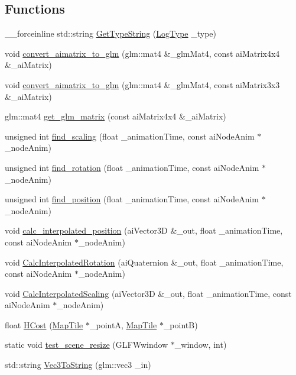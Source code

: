 \subsection*{Functions}
\begin{DoxyCompactItemize}
\item 
\+\_\+\+\_\+forceinline std\+::string \mbox{\hyperlink{namespacepiolot_a488b12f83c55ec14c4a0b967d089b0f2}{Get\+Type\+String}} (\mbox{\hyperlink{namespacepiolot_a23b501c43e72ecf3dbf1146b2919c3a3}{Log\+Type}} \+\_\+type)
\item 
void \mbox{\hyperlink{namespacepiolot_a2458e8951ed1473d866e7a5567a3342a}{convert\+\_\+aimatrix\+\_\+to\+\_\+glm}} (glm\+::mat4 \&\+\_\+glm\+Mat4, const ai\+Matrix4x4 \&\+\_\+ai\+Matrix)
\item 
void \mbox{\hyperlink{namespacepiolot_a3ccd1d151ed200e3777ef66fae46f2cf}{convert\+\_\+aimatrix\+\_\+to\+\_\+glm}} (glm\+::mat4 \&\+\_\+glm\+Mat4, const ai\+Matrix3x3 \&\+\_\+ai\+Matrix)
\item 
glm\+::mat4 \mbox{\hyperlink{namespacepiolot_a935ff41053563f29ec150b73a083a3b8}{get\+\_\+glm\+\_\+matrix}} (const ai\+Matrix4x4 \&\+\_\+ai\+Matrix)
\item 
unsigned int \mbox{\hyperlink{namespacepiolot_a568b9e7ad3c877dcd9b32fa4e6f6c9e1}{find\+\_\+scaling}} (float \+\_\+animation\+Time, const ai\+Node\+Anim $\ast$\+\_\+node\+Anim)
\item 
unsigned int \mbox{\hyperlink{namespacepiolot_a3573afdd46fe4ac83df06c50a0dfe0f3}{find\+\_\+rotation}} (float \+\_\+animation\+Time, const ai\+Node\+Anim $\ast$\+\_\+node\+Anim)
\item 
unsigned int \mbox{\hyperlink{namespacepiolot_aec1ad7fb84906e9bbeb5f140d8b9a0b6}{find\+\_\+position}} (float \+\_\+animation\+Time, const ai\+Node\+Anim $\ast$\+\_\+node\+Anim)
\item 
void \mbox{\hyperlink{namespacepiolot_a1e5ba3095d4e569745a7e0aa844faa11}{calc\+\_\+interpolated\+\_\+position}} (ai\+Vector3D \&\+\_\+out, float \+\_\+animation\+Time, const ai\+Node\+Anim $\ast$\+\_\+node\+Anim)
\item 
void \mbox{\hyperlink{namespacepiolot_a22a267ba7b419acc67701bad790e186f}{Calc\+Interpolated\+Rotation}} (ai\+Quaternion \&\+\_\+out, float \+\_\+animation\+Time, const ai\+Node\+Anim $\ast$\+\_\+node\+Anim)
\item 
void \mbox{\hyperlink{namespacepiolot_a66a046124f1f3d518e9f66ad63de5f51}{Calc\+Interpolated\+Scaling}} (ai\+Vector3D \&\+\_\+out, float \+\_\+animation\+Time, const ai\+Node\+Anim $\ast$\+\_\+node\+Anim)
\item 
float \mbox{\hyperlink{namespacepiolot_adf45d5b01aecdade8cbb9ba156173a78}{H\+Cost}} (\mbox{\hyperlink{classpiolot_1_1_map_tile}{Map\+Tile}} $\ast$\+\_\+pointA, \mbox{\hyperlink{classpiolot_1_1_map_tile}{Map\+Tile}} $\ast$\+\_\+pointB)
\item 
static void \mbox{\hyperlink{namespacepiolot_aa0ef29ea15ee9e00027a276fa8d430e6}{test\+\_\+scene\+\_\+resize}} (G\+L\+F\+Wwindow $\ast$\+\_\+window, int)
\item 
std\+::string \mbox{\hyperlink{namespacepiolot_aabcb03e5a4ebbaf9adcfece35c961480}{Vec3\+To\+String}} (glm\+::vec3 \+\_\+in)
\end{DoxyCompactItemize}
